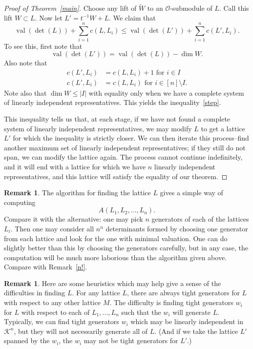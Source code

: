 \documentclass[10pt]{amsart}
\theoremstyle{definition}
\newtheorem{rema}[theorem]{Remark}
\newcommand{\cO}{\mathcal{O}}
\newcommand{\cK}{\mathcal{K}}
\newcommand{\val}{\operatorname{val}}
\begin{document}
\begin{proof}[Proof of Theorem~\ref{main}]
Choose any lift of $\tilde{W}$ to an $\cO$-submodule of $L$. Call this lift $W \subset L$. Now let $L' = t^{-1}W + L$. We claim that
\begin{equation} \label{step}
\val(\det(L)) + \sum_{i=1}^n c(L,L_i) \leq \val(\det(L')) + \sum_{i=1}^n c(L',L_i) .
\end{equation}
To see this, first note that 
\[
\val(\det(L')) = \val(\det(L)) - \dim W.
\]
Also note that 
\begin{align*}
c(L',L_i) &= c(L,L_i) + 1 \text{ for } i \in I
\\
c(L',L_i) &= c(L,L_i) \text{ for } i \in [n] \setminus I.
\end{align*}
Note also that $\dim W \leq |I|$ with equality only when we have a complete system of linearly independent representatives. This yields the inequality~\eqref{step}.

This inequality tells us that, at each stage, if we have not found a complete system of linearly independent representatives, we may modify $L$ to get a lattice $L'$ for which the inequality is strictly closer. We can then iterate this process--find another maximum set of linearly independent representatives; if they still do not span, we can modify the lattice again. The process cannot continue indefinitely, and it will end with a lattice for which we have $n$ linearly independent representatives, and this lattice will satisfy the equality of our theorem.
\end{proof}

\begin{rema} \label{n^n} The algorithm for finding the lattice $L$ gives a simple way of computing 
\[
A(L_1, L_2, \dots, L_n).
\] 
Compare it with the alternative: one may pick $n$ generators of each of the lattices $L_i$. Then one may consider all $n^n$ determinants formed by choosing one generator from each lattice and look for the one with minimal valuation. One can do slightly better than this by choosing the generators carefully, but in any case, the computation will be much more laborious than the algorithm given above. Compare with Remark~\ref{n!}.
\end{rema}

\begin{rema} Here are some heuristics which may help give a sense of the difficulties in finding $L$. For any lattice $L$, there are always tight generators for $L$ with respect to any other lattice $M$. The difficulty is finding tight generators $w_i$ for $L$ with respect to each of $L_1, \dots, L_n$ such that the $w_i$ will generate $L$. Typically, we can find tight generators $w_i$ which may be linearly independent in $\cK^n$, but they will not necessarily generate all of $L$. (And if we take the lattice $L'$ spanned by the $w_i$, the $w_i$ may not be tight generators for $L'$.)
\end{rema}
\end{document}
